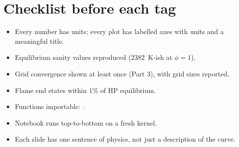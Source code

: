 \section{Checklist before each tag}
\begin{itemize}
  \item[$\square$] Every number has units; every plot has labelled axes with units and a meaningful title.
  \item[$\square$] Equilibrium sanity values reproduced (\SI{2382}{\kelvin}-ish at $\phi=1$).
  \item[$\square$] Grid convergence shown at least once (Part 3), with grid sizes reported.
  \item[$\square$] Flame end states within 1\% of HP equilibrium.
  \item[$\square$] Functions importable: .
  \item[$\square$] Notebook runs top-to-bottom on a fresh kernel.
  \item[$\square$] Each slide has one sentence of physics, not just a description of the curve.
\end{itemize}
